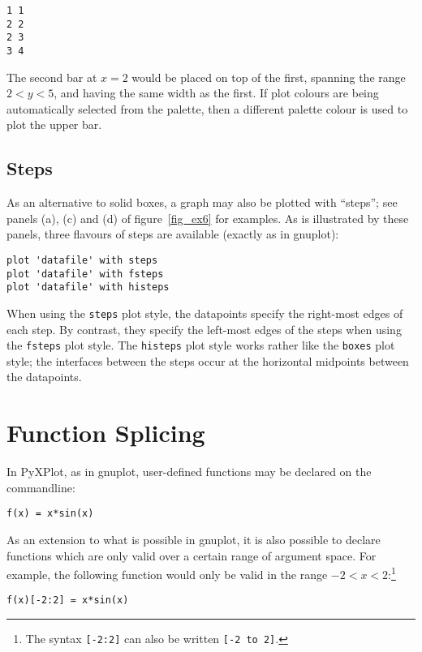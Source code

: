 \documentclass[a4paper,onecolumn,11pt]{book}
\begin{document}
\begin{verbatim} 
1 1
2 2
2 3
3 4
\end{verbatim}

The second bar at $x=2$ would be placed on top of the first, spanning the range
$2<y<5$, and having the same width as the first. If plot colours are being
automatically selected from the palette, then a different palette colour is
used to plot the upper bar.

\subsection{Steps}

As an alternative to solid boxes, a graph may also be plotted with ``steps'';
see panels (a), (c) and (d) of figure~\ref{fig_ex6} for examples. As is
illustrated by these panels, three flavours of steps are available (exactly as
in gnuplot):

\begin{verbatim}
plot 'datafile' with steps 
plot 'datafile' with fsteps 
plot 'datafile' with histeps
\end{verbatim}

When using the \texttt{steps} plot style, the datapoints specify the right-most
edges of each step. By contrast, they specify the left-most edges of the steps
when using the \texttt{fsteps} plot style. The \texttt{histeps} plot style
works rather like the \texttt{boxes} plot style; the interfaces between the
steps occur at the horizontal midpoints between the datapoints.

\section{Function Splicing}

In PyXPlot, as in gnuplot, user-defined functions may be declared on the
commandline:

\begin{verbatim}
f(x) = x*sin(x)
\end{verbatim}

\noindent As an extension to what is possible in gnuplot, it is also possible
to declare functions which are only valid over a certain range of argument
space. For example, the following function would only be valid in the range
$-2<x<2$:\footnote{The syntax \texttt{[-2:2]} can also be written \texttt{[-2
to 2]}.}

\begin{verbatim}
f(x)[-2:2] = x*sin(x)
\end{verbatim}
\end{document}
